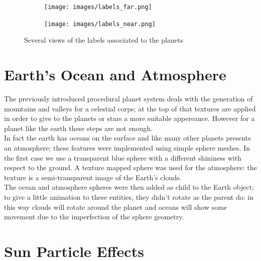 \documentclass[paper=a4, fontsize=11pt]{scrartcl} %
\numberwithin{equation}{section} %
\numberwithin{figure}{section} %
\numberwithin{table}{section} %
\theoremstyle{definition}
\begin{document}
\begin{figure}
	\centering
	\begin{subfigure}{.4\textwidth}
		\centering
		\texttt{[image: images/labels\_far.png]}
	\end{subfigure}
	\begin{subfigure}{.4\textwidth}
		\centering
		\texttt{[image: images/labels\_near.png]}
	\end{subfigure}
	\caption{Several views of the labels associated to the planets}
	\label{fig:labels}
\end{figure}


\section{Earth's Ocean and Atmosphere}

The previously introduced procedural planet system deals with the generation of mountains and valleys for a celestial corps; at the top of that textures are applied in order to give to the planets or stars a more suitable appereance. However for a planet like the earth these steps are not enough.\\
In fact the earth has oceans on the surface and like many other planets presents an atmosphere; these features were implemented using simple sphere meshes. In the first case we use a transparent blue sphere with a different shininess with respect to the ground. A texture mapped sphere was used for the atmosphere: the texture is a semi-transparent image of the Earth's clouds.\\
The ocean and atmosphere spheres were then added as child to the Earth object; to give a little animation to these entities, they didn't rotate as the parent do: in this way clouds will rotate around the planet and oceans will show some movement due to the imperfection of the sphere geometry.


\section{Sun Particle Effects}
\end{document}
